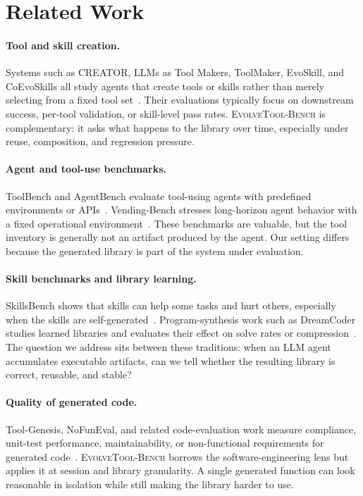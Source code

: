 \documentclass[sigconf,anonymous,review,natbib=false]{acmart}
\begin{document}
\section{Related Work}

\paragraph{Tool and skill creation.}
Systems such as CREATOR, LLMs as Tool Makers, ToolMaker, EvoSkill, and CoEvoSkills all study agents that create tools or skills rather than merely selecting from a fixed tool set~\cite{qian2023creator,cai2023latm,wolflein2025toolmaker,alzubi2026evoskill,zhang2026coevoskills}. Their evaluations typically focus on downstream success, per-tool validation, or skill-level pass rates. \textsc{EvolveTool-Bench} is complementary: it asks what happens to the library over time, especially under reuse, composition, and regression pressure.

\paragraph{Agent and tool-use benchmarks.}
ToolBench and AgentBench evaluate tool-using agents with predefined environments or APIs~\cite{qin2023toolbench,liu2024agentbench}. Vending-Bench stresses long-horizon agent behavior with a fixed operational environment~\cite{backlund2025vendingbench}. These benchmarks are valuable, but the tool inventory is generally not an artifact produced by the agent. Our setting differs because the generated library is part of the system under evaluation.

\paragraph{Skill benchmarks and library learning.}
SkillsBench shows that skills can help some tasks and hurt others, especially when the skills are self-generated~\cite{skillsbench2026}. Program-synthesis work such as DreamCoder studies learned libraries and evaluates their effect on solve rates or compression~\cite{ellis2021dreamcoder}. The question we address sits between these traditions: when an LLM agent accumulates executable artifacts, can we tell whether the resulting library is correct, reusable, and stable?

\paragraph{Quality of generated code.}
Tool-Genesis, NoFunEval, and related code-evaluation work measure compliance, unit-test performance, maintainability, or non-functional requirements for generated code~\cite{xia2026toolgenesis,singhal2024nofuneval}. \textsc{EvolveTool-Bench} borrows the software-engineering lens but applies it at session and library granularity. A single generated function can look reasonable in isolation while still making the library harder to use.
\end{document}
